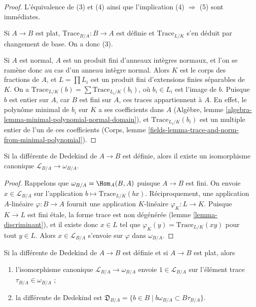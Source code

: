 \begin{proof}
L'équivalence de (3) et (4) ainsi que
l'implication (4) $\Rightarrow$ (5) sont immédiates.

\medskip\noindent
Si $A \to B$ est plat, $\text{Trace}_{B/A} : B \to A$ est
définie et $\text{Trace}_{L/K}$ s'en déduit par changement de base. On a donc (3).

\medskip\noindent
Si $A$ est normal, $A$ est un produit fini d'anneaux intègres normaux,
et l'on se ramène donc au cas d'un anneau intègre normal. Alors $K$ est
le corps des fractions de $A$, et $L = \prod L_i$ est un produit fini
d'extensions finies séparables de $K$. On a
$\text{Trace}_{L/K}(b) = \sum \text{Trace}_{L_i/K}(b_i)$,
où $b_i \in L_i$ est l'image de $b$.
Puisque $b$ est entier sur $A$, car $B$ est fini sur $A$,
ces traces appartiennent à $A$. En effet, le
polynôme minimal de $b_i$ sur $K$ a ses coefficients dans $A$
(Algèbre, lemme \ref{algebra-lemma-minimal-polynomial-normal-domain}),
et $\text{Trace}_{L_i/K}(b_i)$ est un
multiple entier de l'un de ces coefficients
(Corps, lemme \ref{fields-lemma-trace-and-norm-from-minimal-polynomial}).
\end{proof}

\begin{lemma}
\label{lemma-dedekind-complementary-module}
Si la différente de Dedekind de $A \to B$ est définie, alors
il existe un isomorphisme canonique
$\mathcal{L}_{B/A} \to \omega_{B/A}$.
\end{lemma}

\begin{proof}
Rappelons que $\omega_{B/A} = \Hom_A(B, A)$ puisque $A \to B$ est fini.
On envoie $x \in \mathcal{L}_{B/A}$ sur l'application
$b \mapsto \text{Trace}_{L/K}(bx)$.
Réciproquement, une application $A$-linéaire $\varphi : B \to A$
fournit une application $K$-linéaire $\varphi_K : L \to K$. Puisque $K \to L$ est fini
étale, la forme trace est non dégénérée
(lemme \ref{lemma-discriminant}), et il existe donc $x \in L$ tel que
$\varphi_K(y) = \text{Trace}_{L/K}(xy)$ pour tout $y \in L$.
Alors $x \in \mathcal{L}_{B/A}$ s'envoie sur $\varphi$ dans $\omega_{B/A}$.
\end{proof}

\begin{lemma}
\label{lemma-flat-dedekind-complementary-module-trace}
Si la différente de Dedekind de $A \to B$ est définie et si $A \to B$ est plat, alors
\begin{enumerate}
\item l'isomorphisme canonique $\mathcal{L}_{B/A} \to \omega_{B/A}$
envoie $1 \in \mathcal{L}_{B/A}$ sur l'élément trace
$\tau_{B/A} \in \omega_{B/A}$ ;
\item la différente de Dedekind est
$\mathfrak{D}_{B/A} = \{b \in B \mid b\omega_{B/A} \subset B\tau_{B/A}\}$.
\end{enumerate}
\end{lemma}

